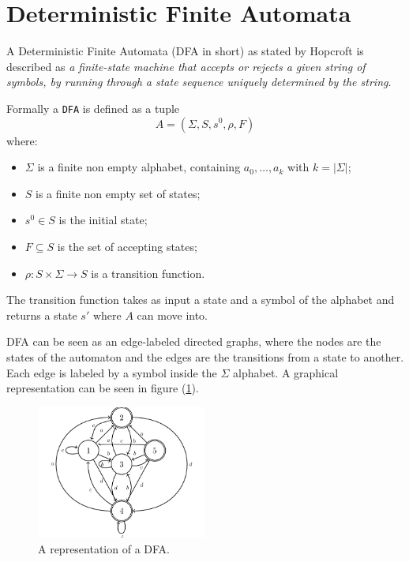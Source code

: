 \documentclass{article}
\begin{document}
\section{Deterministic Finite Automata}\label{sec:dfa} %
A Deterministic Finite Automata (DFA in short) as stated by Hopcroft \cite{hopcroft2001automata} is described as \textit{a finite-state machine that accepts or rejects a given string of symbols, by running through a state sequence uniquely determined by the string}.  

Formally a \verb|DFA| is defined as a tuple
\begin{equation}
    A = (\Sigma, S, s^0, \rho, F)
\end{equation}
where:
\begin{itemize}
    \item $\Sigma$ is a finite non empty alphabet, containing $a_0, \dots, a_k$ with $k = |\Sigma|$;
    \item $S$ is a finite non empty set of states;
    \item $s^0 \in S$ is the initial state;
    \item $F\subseteq S$ is the set of accepting states;
    \item $\rho : S \times \Sigma \rightarrow S$ is a transition function.
\end{itemize}

The transition function takes as input a state and a symbol of the alphabet and returns a state $s'$ where $A$ can move into.

DFA can be seen as an edge-labeled directed graphs, where the nodes are the states of the automaton and the edges are the transitions from a state to another. Each edge is labeled by a symbol inside the $\Sigma$ alphabet. A graphical representation can be seen in figure (\ref{fig:DFA}).

\begin{figure}[h]
	\centering
	\includegraphics[width=0.5\textwidth]{images/dfa.png}
	\caption{A representation of a DFA.}
	\label{fig:DFA}
\end{figure}
\end{document}
